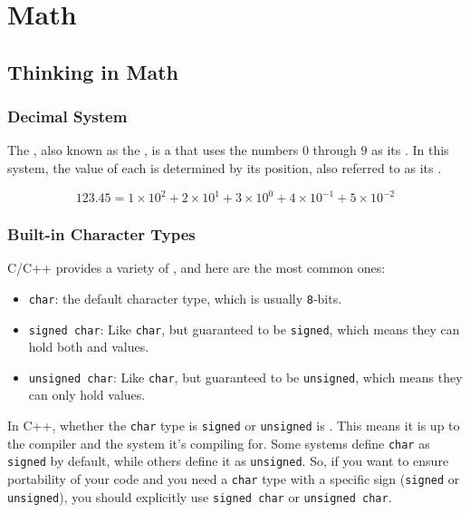 \chapter{Math}
\section{Thinking in Math}
\subsection{Decimal System}
The {\color{blue}{decimal system}}, also known as the {\color{blue}{base-$10$ system}}, is a {\color{blue}{positional system}} that uses the numbers $0$ through $9$ as its {\color{blue}{base}}. In this system, the value of each {\color{blue}{digit}} is determined by its position, also referred to as its {\color{blue}{place value}}.

\begin{equation}
123.45 = 1 \times 10^2 + 2 \times 10^1 + 3 \times 10^0 + 4 \times 10^{-1} + 5 \times 10^{-2}
\end{equation}

\subsection{Built-in Character Types}
C/C++ provides a variety of {\color{blue}{character types}}, and here are the most common ones:
\begin{itemize}
\item {\colorbox{CodeBackground}{\lstinline|char|}}: the default character type, which is usually {\colorbox{CodeBackground}{\lstinline|8|}}-bits.
\item {\colorbox{CodeBackground}{\lstinline|signed char|}}: Like {\colorbox{CodeBackground}{\lstinline|char|}}, but guaranteed to be {\colorbox{CodeBackground}{\lstinline|signed|}}, which means they can hold both {\color{blue}{positive}} and {\color{blue}{negative}} values. 
\item {\colorbox{CodeBackground}{\lstinline|unsigned char|}}: Like {\colorbox{CodeBackground}{\lstinline|char|}}, but guaranteed to be {\colorbox{CodeBackground}{\lstinline|unsigned|}}, which means they can only hold {\color{blue}{positive}} values.
\end{itemize}

In C++, whether the {\colorbox{CodeBackground}{\lstinline|char|}} type is {\colorbox{CodeBackground}{\lstinline|signed|}} or {\colorbox{CodeBackground}{\lstinline|unsigned|}} is {\color{blue}{implementation-defined}}. This means it is up to the compiler and the system it's compiling for. Some systems define {\colorbox{CodeBackground}{\lstinline|char|}} as {\colorbox{CodeBackground}{\lstinline|signed|}} by default, while others define it as {\colorbox{CodeBackground}{\lstinline|unsigned|}}. So, if you want to ensure portability of your code and you need a {\colorbox{CodeBackground}{\lstinline|char|}} type with a specific sign ({\colorbox{CodeBackground}{\lstinline|signed|}} or {\colorbox{CodeBackground}{\lstinline|unsigned|}}), you should explicitly use {\colorbox{CodeBackground}{\lstinline|signed char|}} or {\colorbox{CodeBackground}{\lstinline|unsigned char|}}.\\

